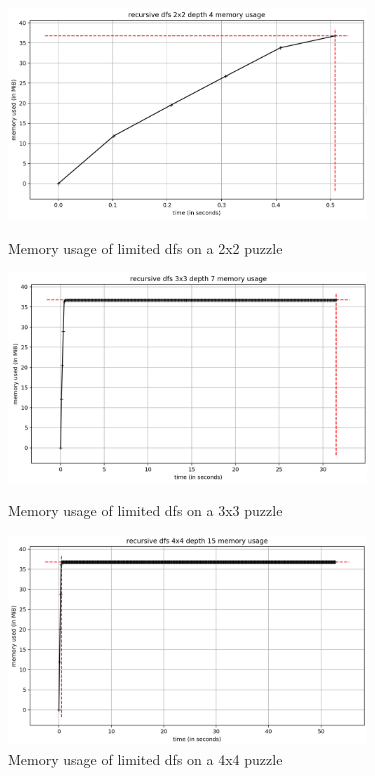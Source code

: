 \documentclass[runningheads]{llncs}
\begin{document}
\begin{figure}
    \centering
    \includegraphics[width=9.5cm]{images/dfs-2x2.png}
    \caption{Memory usage of limited dfs on a 2x2 puzzle} \label{fig1}
    \includegraphics[width=9.5cm]{images/dfs-3x3.png}
    \caption{Memory usage of limited dfs on a 3x3 puzzle} \label{fig2}
    \includegraphics[width=9.5cm]{images/dfs-4x4.png}
    \caption{Memory usage of limited dfs on a 4x4 puzzle} \label{fig3}
\end{figure}
\end{document}
